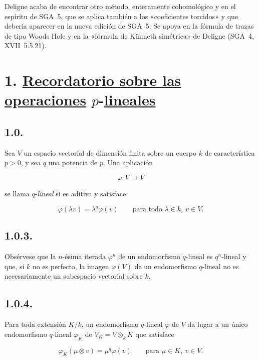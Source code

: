Deligne acaba de encontrar otro método, enteramente cohomológico y en el
espíritu de SGA~5, que se aplica también a los «coeficientes torcidos» y que
debería aparecer en la nueva edición de SGA~5. Se apoya en la fórmula de
trazas de tipo Woods Hole y en la «fórmula de Künneth simétrica» de Deligne
(SGA~4, XVII~5.5.21).

\section*{\texorpdfstring{1. \underline{Recordatorio sobre las operaciones}
$p$-\underline{lineales}}{1. Recordatorio sobre las operaciones p-lineales}}

\subsection*{1.0.}
Sea $V$ un espacio vectorial de dimensión finita sobre un cuerpo $k$ de
característica $p>0$, y sea $q$ una potencia de $p$. Una aplicación

\begin{equation}\tag{1.0.1}
\varphi:V\longrightarrow V
\end{equation}

se llama $q$-\emph{lineal} si es aditiva y satisface

\begin{equation}\tag{1.0.2}
\varphi(\lambda v)=\lambda^q\varphi(v)
\qquad\text{para todo }\lambda\in k,\ v\in V.
\end{equation}

\subsection*{1.0.3.}
Obsérvese que la $n$-ésima iterada $\varphi^n$ de un endomorfismo
$q$-lineal es $q^n$-lineal y que, si $k$ no es perfecto, la imagen
$\varphi(V)$ de un endomorfismo $q$-lineal no es necesariamente un
subespacio vectorial sobre $k$.

\subsection*{1.0.4.}
Para toda extensión $K/k$, un endomorfismo $q$-lineal $\varphi$ de $V$
da lugar a un único endomorfismo $q$-lineal $\varphi_K$ de
$V_K=V\otimes_kK$ que satisface

\begin{equation}\tag{1.0.5}
\varphi_K(\mu\otimes v)=\mu^q\varphi(v)
\qquad\text{para }\mu\in K,\ v\in V.
\end{equation}

